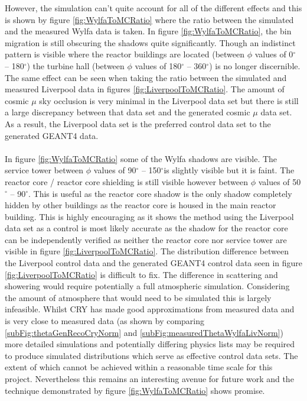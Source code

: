 However, the simulation can't quite account for all of the different effects and this is shown by figure \ref{fig:WylfaToMCRatio} where the ratio between the simulated and the measured Wylfa data is taken. In figure \ref{fig:WylfaToMCRatio}, the bin migration is still obscuring the shadows quite significantly. Though an indistinct pattern is visible where the reactor buildings are located (between $\phi$ values of 0$^\circ$ -- 180$^\circ$) the turbine hall (between $\phi$ values of 180$^\circ$ -- 360$^\circ$) is no longer discernible. The same effect can be seen when taking the ratio between the simulated and measured Liverpool data in figures \ref{fig:LiverpoolToMCRatio}. The amount of cosmic $\mu$ sky occlusion is very minimal in the Liverpool data set but there is still a large discrepancy between that data set and the generated cosmic $\mu$ data set. As a result, the Liverpool data set is the preferred control data set to the generated GEANT4 data. 
\\\\ In figure \ref{fig:WylfaToMCRatio} some of the Wylfa shadows are visible. The service tower between $\phi$ values of 90$^\circ$ -- 150$^\circ$is slightly visible but it is faint. The reactor core / reactor core shielding is still visible however between $\phi$ values of 50$^\circ$ -- 90$^\circ$. This is useful as the reactor core shadow is the only shadow completely hidden by other buildings as the reactor core is housed in the main reactor building. This is highly encouraging as it shows the method using the Liverpool data set as a control is most likely accurate as the shadow for the reactor core can be independently verified as neither the reactor core nor service tower are visible in figure \ref{fig:LiverpoolToMCRatio}. The distribution difference between the Liverpool control data and the generated GEANT4 control data seen in figure \ref{fig:LiverpoolToMCRatio} is difficult to fix. The difference in scattering and showering would require potentially a full atmospheric simulation. Considering the amount of atmosphere that would need to be simulated this is largely infeasible. Whilst CRY has made good approximations from measured data and is very close to measured data (as shown by comparing \ref{subFig:thetaGenRecoCryNorm} and \ref{subFig:measuredThetaWylfaLivNorm}) more detailed simulations and potentially differing physics lists may be required to produce simulated distributions which serve as effective control data sets. The extent of which cannot be achieved within a reasonable time scale for this project. Nevertheless this remains an interesting avenue for future work and the technique demonstrated by figure \ref{fig:WylfaToMCRatio} shows promise. 

